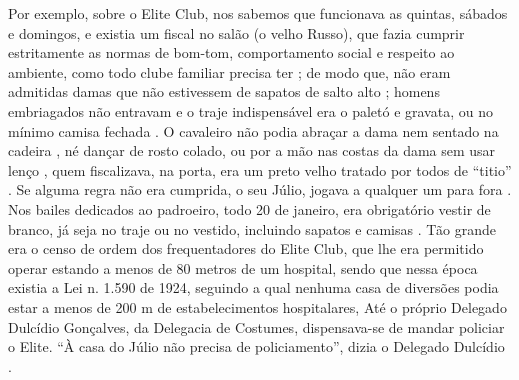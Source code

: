 Por exemplo, sobre o Elite Club,  nos sabemos que funcionava as quintas, sábados e domingos,
e existia um fiscal no salão (o velho Russo)\cite[pp. 37]{gafieirajournalmanchete}, 
que fazia cumprir estritamente as normas de bom-tom, comportamento social e respeito ao ambiente, como todo clube familiar precisa ter \cite[pp. 12]{respeitojournalbrasil1}; de modo que, 
não eram admitidas damas que não estivessem de sapatos de salto alto \cite[pp. 37]{gafieirajournalmanchete};
homens embriagados não entravam e o traje indispensável era o paletó e gravata, 
ou no mínimo camisa fechada \cite[pp. 6 - cad. B]{entrevistajuliojournalbrasil1}.
O cavaleiro não podia abraçar a dama nem sentado na cadeira \cite[pp. 6 - cad. B]{entrevistajuliojournalbrasil1},
né dançar de rosto colado, ou por a mão nas costas da dama sem usar lenço \cite[pp. 10]{simoesjournalbrasil1}, 
quem fiscalizava, na porta, era um preto velho tratado por todos de ``titio''  \cite[pp. 37]{gafieirajournalmanchete}.
Se alguma regra não era cumprida, o seu Júlio, jogava a qualquer um para fora \cite[pp. 6 - cad. B]{entrevistajuliojournalbrasil1}.
Nos bailes dedicados ao padroeiro, todo 20 de janeiro, era obrigatório vestir de branco,
já seja no traje ou no vestido, incluindo sapatos e camisas \cite[pp. 37]{gafieirajournalmanchete}.
Tão grande era o censo de ordem dos frequentadores do Elite Club, 
que lhe era permitido operar estando a menos de 80 metros de um hospital,
sendo que nessa época existia a Lei n. 1.590 de 1924, 
seguindo a qual nenhuma casa de diversões podia estar a menos de 200 m de estabelecimentos hospitalares,
Até o próprio Delegado Dulcídio Gonçalves, da Delegacia de Costumes,
dispensava-se de mandar policiar o Elite.
``À casa do Júlio não precisa de policiamento'', dizia o Delegado Dulcídio
\cite[pp. 5]{simoesjournalalutademocratica1}.



